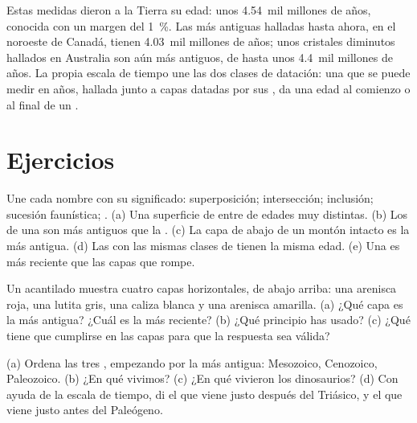 Estas medidas dieron a la Tierra su edad: unos \num{4.54}~mil millones de
años, conocida con un margen del 1~\%. Las  más antiguas halladas
hasta ahora, en el noroeste de Canadá, tienen \num{4.03}~mil millones de
años; unos cristales diminutos hallados en Australia son aún más antiguos,
de hasta unos \num{4.4}~mil millones de años. La propia escala de tiempo
une las dos clases de datación: una  que se puede medir en años,
hallada junto a capas datadas por sus , da una edad al comienzo o
al final de un .

\section{Ejercicios}

\begin{exercise}[$\star$]\label{exo:g7:geological-time:1}
Une cada nombre con su significado: superposición; intersección;
inclusión; sucesión faunística; . (a) Una superficie de
 entre  de edades muy distintas. (b) Los  de una  son
más antiguos que la . (c) La capa de abajo de un montón intacto es la
más antigua. (d) Las  con las mismas clases de  tienen la
misma edad. (e) Una  es más reciente que las capas que rompe.
\end{exercise}

\begin{exercise}[$\star$]\label{exo:g7:geological-time:2}
Un acantilado muestra cuatro capas horizontales, de abajo arriba: una
arenisca roja, una lutita gris, una caliza blanca y una arenisca amarilla.
(a) ¿Qué capa es la más antigua? ¿Cuál es la más reciente? (b) ¿Qué
principio has usado? (c) ¿Qué tiene que cumplirse en las capas para que la
respuesta sea válida?
\end{exercise}

\begin{exercise}[$\star$]\label{exo:g7:geological-time:3}
(a) Ordena las tres , empezando por la más antigua: Mesozoico,
Cenozoico, Paleozoico. (b) ¿En qué  vivimos? (c) ¿En qué  vivieron
los dinosaurios? (d) Con ayuda de la escala de tiempo, di el  que viene justo después del Triásico, y el que viene justo
antes del Paleógeno.
\end{exercise}

